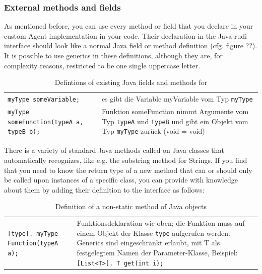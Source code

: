 \subsubsection{External methods and fields}

As mentioned before, you can use every method or field that you declare in your custom Agent implementation in your \vonda code. Their declaration in the Java-rudi interface should look like a normal Java field or method definition (cfg. figure ??). It is possible to use generics in these definitions, although they are, for complexity reasons, restricted to be one single uppercase letter.


\begin{table}[htbp]
  \centering
  \small
  \begin{tabular}{lp{}}
    \texttt{myType someVariable;}
    &  es gibt die Variable myVariable vom Typ \texttt{myType} \\

    \texttt{myType someFunction(typeA a, typeB b);}
    &  Funktion someFunction nimmt Argumente vom Typ \texttt{typeA} und
      \texttt{typeB} und gibt ein Objekt vom Typ \texttt{myType} zurück (void =
      void)
  \end{tabular}

  \caption{Defintions of existing Java fields and methods for \vonda}
  \label{tab:typeinference}
\end{table}

There is a variety of standard Java methods called on Java classes that \vonda automatically recognizes, like e.g. the substring method for Strings. If you find that you need \vonda to know the return type of a new method that can or should only be called upon instances of a specific class, you can provide \vonda with knowledge about them by adding their definition to the interface as follows:


\begin{table}[htbp]
  \centering
  \small
  \begin{tabular}{lp{}}

    \texttt{[type]. myType Function(typeA a);}
    & Funktionsdeklaration wie oben; die Funktion muss auf einem Objekt der
      Klasse \texttt{type} aufgerufen werden. Generics sind eingeschränkt
      erlaubt, mit T als festgelegtem Namen der Parameter-Klasse,
      Beispiel:\newline\texttt{[List<T>]. T get(int i);}
  \end{tabular}

  \caption{Definition of a non-static method of Java objects}
  \label{tab:typeinference}
\end{table}

